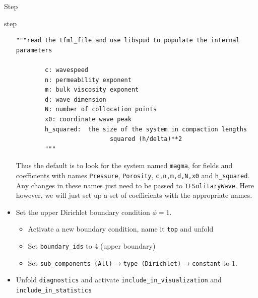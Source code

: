 \begin{steps}{Step}
\begin{steps}{step}
\begin{itemize}
\begin{lstlisting}[style=Python]
     """read the tfml_file and use libspud to populate the internal parameters

        c: wavespeed
        n: permeability exponent
        m: bulk viscosity exponent
        d: wave dimension
        N: number of collocation points
        x0: coordinate wave peak
        h_squared:  the size of the system in compaction lengths
                          squared (h/delta)**2
        """
\end{lstlisting}
Thus the default is to look for the system named \texttt{magma}, for
fields and coefficients with names \texttt{Pressure},
\texttt{Porosity}, \texttt{c,n,m,d,N,x0} and \texttt{h\_squared}.  Any
changes in these names just need to be passed to
\texttt{TFSolitaryWave}.  Here however, we will just set up a set of
coefficients with the appropriate names.
        \item Set the upper Dirichlet boundary condition $\phi=1$.
    \begin{itemize}
    \item Activate a new boundary condition, name it \texttt{top} and unfold
    \item Set \texttt{boundary\_ids} to 4 (upper boundary)
    \item Set \texttt{sub\_components (All)}$\rightarrow$\texttt{type
        (Dirichlet)}$\rightarrow$\texttt{constant} to 1.
    \end{itemize}
  \item Unfold \texttt{diagnostics} and activate
      \texttt{include\_in\_visualization} and \texttt{include\_in\_statistics}

    \end{itemize}


\end{steps}
\end{steps}
